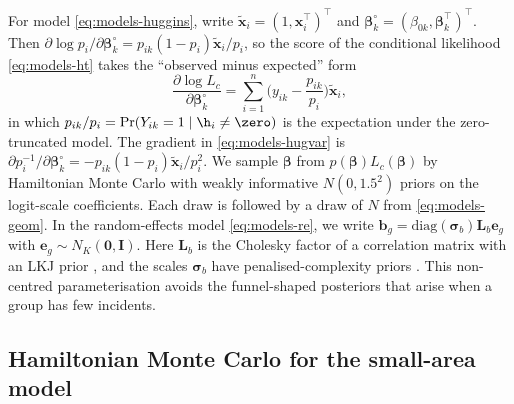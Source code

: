 For model \eqref{eq:models-huggins}, write $\tilde{\bm x}_i=(1,\bm x_i^{\top})^{\top}$ and $\bm\beta_k^\circ=(\beta_{0k},\bm\beta_k^{\top})^{\top}$. Then $\partial\log p_i/\partial\bm\beta_k^\circ=p_{ik}(1-p_i)\tilde{\bm x}_i/p_i$, so the score of the conditional likelihood \eqref{eq:models-ht} takes the ``observed minus expected'' form
\begin{equation}\label{eq:app-score}
  \frac{\partial\log L_c}{\partial\bm\beta_k^\circ}=\sum_{i=1}^{n}\Big(y_{ik}-\frac{p_{ik}}{p_i}\Big)\tilde{\bm x}_i,
\end{equation}
in which $p_{ik}/p_i=\Pr(Y_{ik}=1\mid\h_i\ne\zero)$ is the expectation under the zero-truncated model. The gradient in \eqref{eq:models-hugvar} is $\partial p_i^{-1}/\partial\bm\beta_k^\circ=-p_{ik}(1-p_i)\tilde{\bm x}_i/p_i^{2}$. We sample $\bm\beta$ from $p(\bm\beta)L_c(\bm\beta)$ by Hamiltonian Monte Carlo with weakly informative $N(0,1.5^2)$ priors on the logit-scale coefficients. Each draw is followed by a draw of $N$ from \eqref{eq:models-geom}. In the random-effects model \eqref{eq:models-re}, we write $\bm b_g=\mathrm{diag}(\bm\sigma_b)\bm L_b\bm e_g$ with $\bm e_g\sim N_K(\bm0,\bm I)$. Here $\bm L_b$ is the Cholesky factor of a correlation matrix with an LKJ prior \citep{lewandowski2009}, and the scales $\bm\sigma_b$ have penalised-complexity priors \citep{simpson2017}. This non-centred parameterisation \citep{papaspiliopoulos2007} avoids the funnel-shaped posteriors that arise when a group has few incidents.

\subsection{Hamiltonian Monte Carlo for the small-area model}\label{app:comp-sae}

